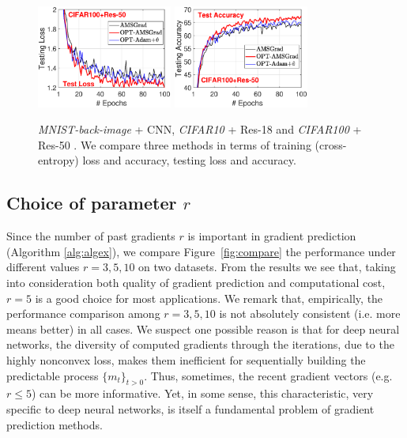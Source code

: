 \documentclass[twoside]{article}
\begin{document}
\begin{figure}
{\includegraphics[width=1.75in]{new_figure/cifar100_test_loss_disz.eps}\hspace{-0.12in}
\includegraphics[width=1.75in]{new_figure/cifar100_test_acc_disz.eps}
}

\caption{\textit{MNIST-back-image} + CNN, \textit{CIFAR10} + Res-18 and \textit{CIFAR100} + Res-50 . We compare three methods in terms of training (cross-entropy) loss and accuracy, testing loss and accuracy.} \label{fig:testandtrain}\vspace{-0.15in}
\end{figure}

\subsection{Choice of parameter $r$}\label{sec:choicer}

Since the number of past gradients $r$ is important in gradient prediction (Algorithm \ref{alg:algex}), we compare Figure~\ref{fig:compare} the performance under different values $r=3,5,10$ on two datasets. 
From the results we see that, taking into consideration both quality of gradient prediction and computational cost, $r=5$ is a good choice for most applications. 
We remark that, empirically, the performance comparison among $r=3,5,10$ is not absolutely consistent (i.e. more means better) in all cases. 
We suspect one possible reason is that for deep neural networks, the diversity of computed gradients through the iterations, due to the highly nonconvex loss, makes them inefficient for sequentially building the predictable process $\{m_t\}_{t>0}$. 
Thus, sometimes, the recent gradient vectors (e.g. $r\leq 5$) can be more informative. 
Yet, in some sense, this characteristic, very specific to deep neural networks, is itself a fundamental problem of gradient prediction methods. 
\end{document}
